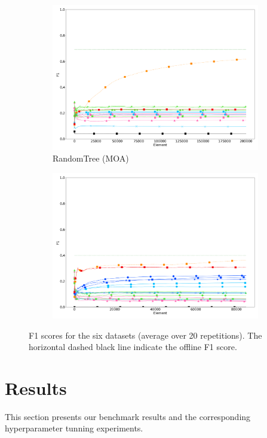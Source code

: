 \begin{figure}
\begin{subfigure}[t]{.49\linewidth}
		\includegraphics[width=\linewidth]{figures/results/dataset_3_f1.png}
		\caption{RandomTree (MOA)}
		\label{fig:f1-dataset_3}
	\end{subfigure}
	\begin{subfigure}[t]{.49\linewidth}
		\includegraphics[width=\linewidth]{figures/results/recofit_6_f1.png}
		\caption{\recofitdataset}
		\label{fig:f1-recofit}
	\end{subfigure}
	\caption{F1 scores for the six datasets (average over 20 repetitions). The
		horizontal dashed black line indicate the offline \knn F1 score.}
	\label{fig:f1}
\end{figure}

\section{Results}
This section presents our benchmark results and the corresponding
hyperparameter tunning experiments.

